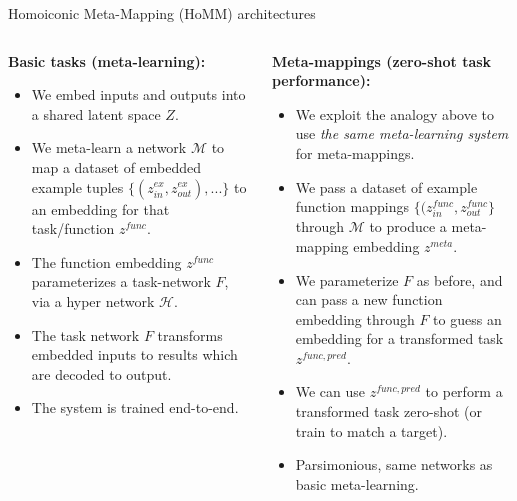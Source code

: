 \documentclass[final]{beamer}
\begin{document}
\begin{frame}[t]{}
\begin{columns}
\begin{column}[t]{0.496\textwidth}
\begin{block}{\huge Homoiconic Meta-Mapping (HoMM) architectures}
\vspace{-0.5em}
\begin{columns}
\begin{column}[t]{0.48\textwidth}
\textbf{Basic tasks (meta-learning):}
\begin{itemize}
\item We embed inputs and outputs into a shared latent space \(Z\). 
\item We meta-learn a network \(\mathcal{M}\) to map a dataset of embedded example tuples \(\{(z^{ex}_{in}, z^{ex}_{out}), ...\}\) to an embedding for that task/function \(z^{func}\). 
\item The function embedding \(z^{func}\) parameterizes a task-network \(F\), via a hyper network \(\mathcal{H}\).
\item The task network \(F\) transforms embedded inputs to results which are decoded to output.
\item The system is trained end-to-end.
\end{itemize}
\end{column}
\begin{column}[t]{0.48\textwidth}
\textbf{Meta-mappings (zero-shot task performance):}
\begin{itemize}
\item We exploit the analogy above to use \emph{the same meta-learning system} for meta-mappings.
\item We pass a dataset of example function mappings \(\{(z^{func}_{in}, z^{func}_{out}\}\) through \(\mathcal{M}\) to produce a meta-mapping embedding \(z^{meta}\). 
\item We parameterize \(F\) as before, and can pass a new function embedding through \(F\) to guess an embedding for a transformed task \(z^{func,pred}\).
\item We can use \(z^{func,pred}\) to perform a transformed task zero-shot (or train to match a target).
\item Parsimonious, same networks as basic meta-learning.
\end{itemize}
\end{column}
\end{columns}

\begin{figure}[H]
\centering
\normalsize
{}
\end{figure}
\end{block}
\end{column}
\end{columns}
\end{frame}
\end{document}
